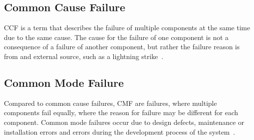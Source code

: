\subsection{Common Cause Failure}\label{subsec:common-cause-failure}
\gls{CCF} is a term that describes the failure of multiple components at the same time due to the same cause.
The cause for the failure of one component is not a consequence of a failure of another component, but rather the failure reason is from and
external source, such as a lightning strike~\cite{ccf,cmf}.

\subsection{Common Mode Failure}\label{subsec:common-mode-failure}
Compared to common cause failures, \gls{CMF} are failures, where multiple components fail equally, where the reason
for failure may be different for each component.
Common mode failures occur due to design defects, maintenance or installation errors and errors during the development process
of the system~\cite{lfs2,cmf}.

